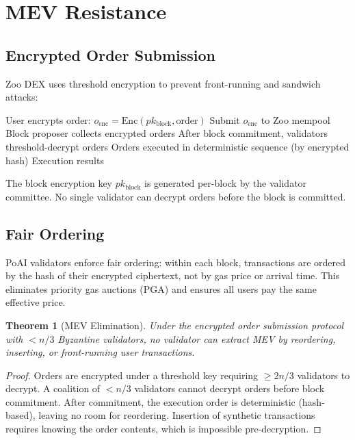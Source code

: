 \documentclass[11pt,letterpaper]{article}
\newtheorem{theorem}{Theorem}[section]
\begin{document}
\section{MEV Resistance}
\label{sec:mev}

\subsection{Encrypted Order Submission}

Zoo DEX uses threshold encryption to prevent front-running and sandwich attacks:

\begin{algorithm}[t]
\caption{Encrypted Order Submission}
\label{alg:mev}
\begin{algorithmic}[1]
\STATE User encrypts order: $o_{\text{enc}} = \text{Enc}(pk_{\text{block}}, \text{order})$
\STATE Submit $o_{\text{enc}}$ to Zoo mempool
\STATE Block proposer collects encrypted orders
\STATE After block commitment, validators threshold-decrypt orders
\STATE Orders executed in deterministic sequence (by encrypted hash)
\RETURN Execution results
\end{algorithmic}
\end{algorithm}

The block encryption key $pk_{\text{block}}$ is generated per-block by the validator committee. No single validator can decrypt orders before the block is committed.

\subsection{Fair Ordering}

PoAI validators enforce fair ordering: within each block, transactions are ordered by the hash of their encrypted ciphertext, not by gas price or arrival time. This eliminates priority gas auctions (PGA) and ensures all users pay the same effective price.

\begin{theorem}[MEV Elimination]
Under the encrypted order submission protocol with $< n/3$ Byzantine validators, no validator can extract MEV by reordering, inserting, or front-running user transactions.
\end{theorem}

\begin{proof}
Orders are encrypted under a threshold key requiring $\geq 2n/3$ validators to decrypt. A coalition of $< n/3$ validators cannot decrypt orders before block commitment. After commitment, the execution order is deterministic (hash-based), leaving no room for reordering. Insertion of synthetic transactions requires knowing the order contents, which is impossible pre-decryption.
\end{proof}
\end{document}
